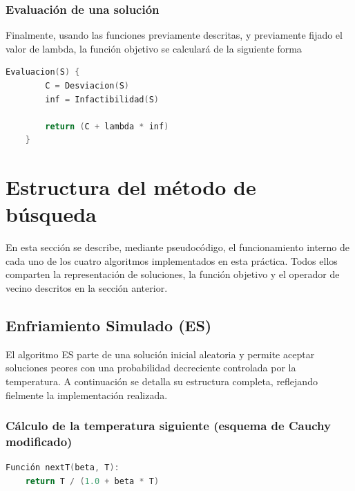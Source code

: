 \documentclass[12pt]{article}
\begin{document}
    \subsubsection{Evaluación de una solución}
    Finalmente, usando las funciones previamente descritas, y previamente fijado el valor de lambda, la función objetivo se calculará de la siguiente forma
\begin{lstlisting}[language=C++, mathescape=true, caption={Pseudocódigo del cálculo de la función objetivo}, label={lst:infeasibility}]
Evaluacion(S) {
        C = Desviacion(S)
        inf = Infactibilidad(S)

        return (C + lambda * inf)
    }
\end{lstlisting}

    \newpage

    \section{Estructura del método de búsqueda}
 
En esta sección se describe, mediante pseudocódigo, el funcionamiento interno de cada
uno de los cuatro algoritmos implementados en esta práctica.  Todos ellos comparten la
representación de soluciones, la función objetivo y el operador de vecino descritos en la
sección anterior.
 
\subsection{Enfriamiento Simulado (ES)}
 
El algoritmo ES parte de una solución inicial aleatoria y permite aceptar soluciones
peores con una probabilidad decreciente controlada por la temperatura.  A continuación
se detalla su estructura completa, reflejando fielmente la implementación realizada.
 
\subsubsection*{Cálculo de la temperatura siguiente (esquema de Cauchy modificado)}
 
\begin{lstlisting}[language=C++, mathescape=true,
    caption={Pseudocódigo del esquema de enfriamiento de Cauchy modificado},
    label={lst:nextT}]
Función nextT(beta, T):
    return T / (1.0 + beta * T)
\end{lstlisting}
 
\end{document}
